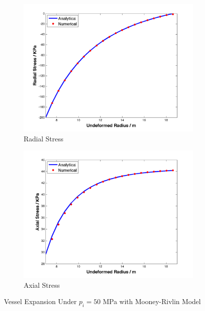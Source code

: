 \begin{figure}[t!p]
	\begin{subfigure}[b]{0.5\textwidth}
		\centering
		\includegraphics[width=\textwidth]{./figures/radial_stress_200.png}
		\caption{Radial Stress}
		\label{radial_200}
	\end{subfigure}
	\begin{subfigure}[b]{0.5\textwidth}
		\centering
		\includegraphics[width=\textwidth]{./figures/axial_stress_200.png}
		\caption{Axial Stress}
		\label{axial_200}
	\end{subfigure}
	\caption{Vessel Expansion Under $p_i = 50$ MPa with Mooney-Rivlin Model}
	\label{fig:mooney-rivlin1}
\end{figure}

